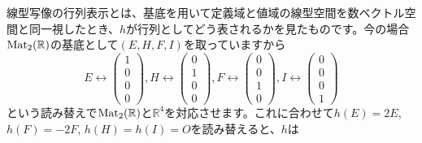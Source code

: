 線型写像の行列表示とは、基底を用いて定義域と値域の線型空間を数ベクトル空間と同一視したとき、$h$が行列としてどう表されるかを見たものです。今の場合$\operatorname{Mat}_2(\mathbb{R})$の基底として$(E, H, F, I)$を取っていますから
\[
E
\longleftrightarrow
\begin{pmatrix}
1 \\
0 \\
0 \\
0
\end{pmatrix}, 
H
\longleftrightarrow
\begin{pmatrix}
0 \\
1 \\
0 \\
0
\end{pmatrix}, 
F
\longleftrightarrow
\begin{pmatrix}
0 \\
0 \\
1 \\
0
\end{pmatrix}, 
I
\longleftrightarrow
\begin{pmatrix}
0 \\
0 \\
0 \\
1
\end{pmatrix}
\]
という読み替えで$\operatorname{Mat}_2(\mathbb{R})$と$\mathbb{R}^4$を対応させます。これに合わせて$h(E) = 2E$, $h(F) = -2F$, $h(H) = h(I) =O$を読み替えると、$h$は
